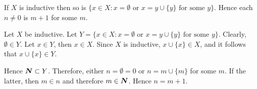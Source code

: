  If $X$ is inductive then so is
$\{ x \in X : x = \emptyset \text{ or } x = y 
\cup \{ y \} \text{ for some } y \}$. Hence each 
$n \neq 0$ is $m + 1$ for some $m$.
\begin{solution}
  Let $X$ be inductive. Let 
  $Y = \{ x \in X : x = \emptyset \text{ or } x = y 
  \cup \{ y \} \text{ for some } y \}$. Clearly, 
  $\emptyset \in Y$. Let $x \in Y$, then $x \in X$. Since $X$ is
  inductive, $x \cup \{ x \} \in X$, and it follows that 
  $x \cup \{ x \} \in Y$.

  Hence $\boldsymbol{N} \subset Y$. Therefore, either $n = \emptyset = 0$ or 
  $n = m \cup \{ m \}$ for some $m$. If the latter, then $m \in n$ and
  therefore $m \in \boldsymbol{N}$. Hence $n = m + 1$.
\end{solution}